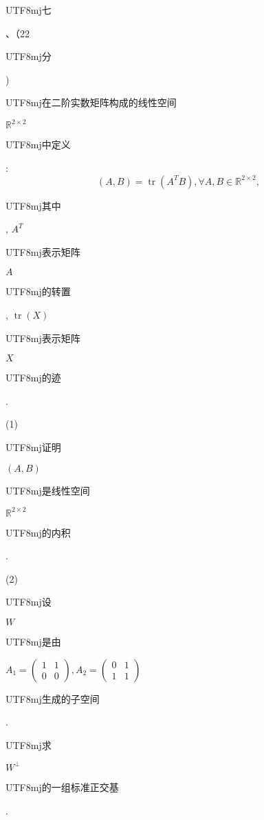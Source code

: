 \documentclass[10pt]{article}
\begin{document}
\begin{CJK}{UTF8}{mj}七\end{CJK}、（22 \begin{CJK}{UTF8}{mj}分\end{CJK}) \begin{CJK}{UTF8}{mj}在二阶实数矩阵构成的线性空间\end{CJK} $\mathbb{R}^{2 \times 2}$ \begin{CJK}{UTF8}{mj}中定义\end{CJK}:
$$
(A, B)=\operatorname{tr}\left(A^{T} B\right), \forall A, B \in \mathbb{R}^{2 \times 2},
$$
\begin{CJK}{UTF8}{mj}其中\end{CJK}, $A^{T}$ \begin{CJK}{UTF8}{mj}表示矩阵\end{CJK} $A$ \begin{CJK}{UTF8}{mj}的转置\end{CJK}, $\operatorname{tr}(X)$ \begin{CJK}{UTF8}{mj}表示矩阵\end{CJK} $X$ \begin{CJK}{UTF8}{mj}的迹\end{CJK}.

(1) \begin{CJK}{UTF8}{mj}证明\end{CJK} $(A, B)$ \begin{CJK}{UTF8}{mj}是线性空间\end{CJK} $\mathbb{R}^{2 \times 2}$ \begin{CJK}{UTF8}{mj}的内积\end{CJK}.

(2) \begin{CJK}{UTF8}{mj}设\end{CJK} $W$ \begin{CJK}{UTF8}{mj}是由\end{CJK} $A_{1}=\left(\begin{array}{ll}1 & 1 \\ 0 & 0\end{array}\right), A_{2}=\left(\begin{array}{ll}0 & 1 \\ 1 & 1\end{array}\right)$ \begin{CJK}{UTF8}{mj}生成的子空间\end{CJK}. \begin{CJK}{UTF8}{mj}求\end{CJK} $W^{\perp}$ \begin{CJK}{UTF8}{mj}的一组标准正交基\end{CJK}.
\end{document}
